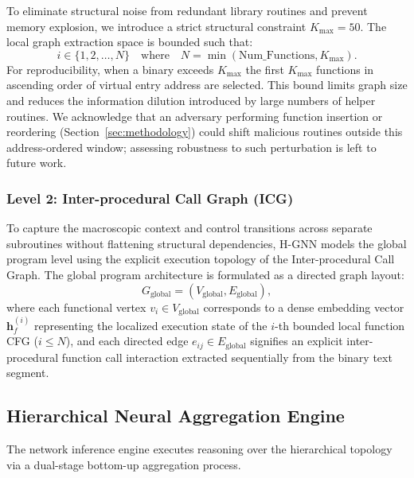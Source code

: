 \documentclass{llncs}
\begin{document}
To eliminate structural noise from redundant library routines and prevent memory explosion, we introduce a strict structural constraint $K_{\text{max}} = 50$. The local graph extraction space is bounded such that:
\begin{equation}
i \in \{1, 2, \dots, N\} \quad \text{where} \quad N = \min(\text{Num\_Functions}, K_{\text{max}}).
\end{equation}
For reproducibility, when a binary exceeds $K_{\text{max}}$ the first $K_{\text{max}}$ functions in ascending order of virtual entry address are selected. This bound limits graph size and reduces the information dilution introduced by large numbers of helper routines. We acknowledge that an adversary performing function insertion or reordering (Section~\ref{sec:methodology}) could shift malicious routines outside this address-ordered window; assessing robustness to such perturbation is left to future work.

\subsubsection{Level 2: Inter-procedural Call Graph (ICG)}
To capture the macroscopic context and control transitions across separate subroutines without flattening structural dependencies, H-GNN models the global program level using the explicit execution topology of the Inter-procedural Call Graph. The global program architecture is formulated as a directed graph layout:
\begin{equation}
G_{\text{global}} = (V_{\text{global}}, E_{\text{global}}),
\end{equation}
where each functional vertex $v_i \in V_{\text{global}}$ corresponds to a dense embedding vector $\mathbf{h}^{(i)}_{f}$ representing the localized execution state of the $i$-th bounded local function CFG ($i \le N$), and each directed edge $e_{ij} \in E_{\text{global}}$ signifies an explicit inter-procedural function call interaction extracted sequentially from the binary text segment.

\subsection{Hierarchical Neural Aggregation Engine}
The network inference engine executes reasoning over the hierarchical topology via a dual-stage bottom-up aggregation process.
\end{document}
